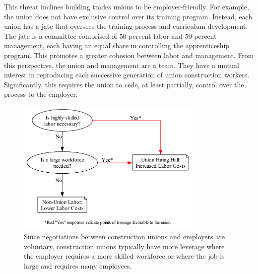 \documentclass[12pt]{article}
\newcommand{\imageWidth}{0.8\textwidth}
\begin{document}
This threat inclines building trades unions to be employer-friendly. For example, the union does not have exclusive control over its training program. Instead, each union has a \acrfull{jatc} that oversees the training process and curriculum development. The \acrshort{jatc} is a committee comprised of 50 percent labor and 50 percent management, each having an equal share in controlling the apprenticeship program. This promotes a greater cohesion between labor and management. From this perspective, the union and management are a team. They have a mutual interest in reproducing each successive generation of union construction workers. Significantly, this requires the union to cede, at least partially, control over the process to the employer. 


\begin{figure}[ht]
  \centering
  \includegraphics[width=\imageWidth]{images/union_power_red}
  \captionsetup{justification=centering, singlelinecheck=false, margin=2cm} 
  \caption[Union Leverage and Power]{Since negotiations between construction unions and employers are voluntary, construction unions typically have more leverage where the employer requires a more skilled workforce or where the job is large and requires many employees.}
  \label{fig:union_power_red}
\end{figure}
\end{document}
